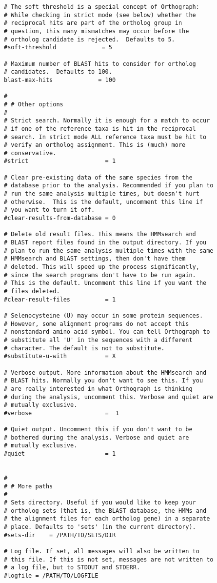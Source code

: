 \begin{verbatim}
# The soft threshold is a special concept of Orthograph:
# While checking in strict mode (see below) whether the
# reciprocal hits are part of the ortholog group in
# question, this many mismatches may occur before the
# ortholog candidate is rejected.  Defaults to 5.
#soft-threshold             = 5

# Maximum number of BLAST hits to consider for ortholog
# candidates.  Defaults to 100.
blast-max-hits             = 100

# 
# # Other options
#
# Strict search. Normally it is enough for a match to occur
# if one of the reference taxa is hit in the reciprocal
# search. In strict mode ALL reference taxa must be hit to
# verify an ortholog assignment. This is (much) more
# conservative.
#strict                      = 1

# Clear pre-existing data of the same species from the
# database prior to the analysis. Recommended if you plan to
# run the same analysis multiple times, but doesn't hurt
# otherwise.  This is the default, uncomment this line if
# you want to turn it off.
#clear-results-from-database = 0

# Delete old result files. This means the HMMsearch and
# BLAST report files found in the output directory. If you
# plan to run the same analysis multiple times with the same
# HMMsearch and BLAST settings, then don't have them
# deleted. This will speed up the process significantly,
# since the search programs don't have to be run again.
# This is the default. Uncomment this line if you want the
# files deleted.
#clear-result-files          = 1

# Selenocysteine (U) may occur in some protein sequences.
# However, some alignment programs do not accept this
# nonstandard amino acid symbol. You can tell Orthograph to
# substitute all 'U' in the sequences with a different
# character. The default is not to substitute.
#substitute-u-with           = X

# Verbose output. More information about the HMMsearch and
# BLAST hits. Normally you don't want to see this. If you
# are really interested in what Orthograph is thinking
# during the analysis, uncomment this. Verbose and quiet are
# mutually exclusive.
#verbose                     =  1

# Quiet output. Uncomment this if you don't want to be
# bothered during the analysis. Verbose and quiet are
# mutually exclusive.
#quiet                       = 1


#
# # More paths
# 
# Sets directory. Useful if you would like to keep your
# ortholog sets (that is, the BLAST database, the HMMs and
# the alignment files for each ortholog gene) in a separate
# place. Defaults to 'sets' (in the current directory).
#sets-dir    = /PATH/TO/SETS/DIR

# Log file. If set, all messages will also be written to
# this file. If this is not set, messages are not written to
# a log file, but to STDOUT and STDERR.
#logfile = /PATH/TO/LOGFILE
\end{verbatim}
